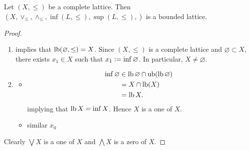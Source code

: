 \documentclass{book}
\begin{document}
	\begin{ex}
		Let $(X, \leq)$ be a complete lattice. Then $(X, \vee_{\leq}, \wedge_{\leq}, \inf(L, \leq), \sup(L, \leq),)$ is a bounded lattice.  
	\end{ex}
	
	\begin{proof}\
		\begin{enumerate}
			\item {} implies that $\operatorname{lb}(\varnothing, \leq) = X$. Since $(X, \leq)$ is a complete lattice and $\varnothing \subset X$, there exists $x_1 \in X$ such that $x_1 \vcentcolon= \inf \varnothing$. In particular, $X \neq \varnothing$.
			\item 
			\begin{itemize}
				\item {} 
				\begin{align*}
					\inf \varnothing
					& \in \operatorname{lb} \varnothing \cap \operatorname{ub} (\operatorname{lb} \varnothing) \\
					& = X \cap \operatorname{lb} (X) \\
					& = \operatorname{lb} X. 
				\end{align*}
				 implying that $\operatorname{lb} X = \inf X$. Hence $X$ is a one of $X$. 
				\item similar $x_0$
			\end{itemize}
		\end{enumerate}
		Clearly $\bigvee X$ is a one of $X$ and $\bigwedge X$ is a zero of $X$.
	\end{proof}
	
	
	
	
	
	
	
	
	
	
	
	
	
	
	
	
	
	
	
	
	
	
	
	
	
	
	
	
	
	
	
	
	
	
	
	
	
	
	
	
	
\end{document}
